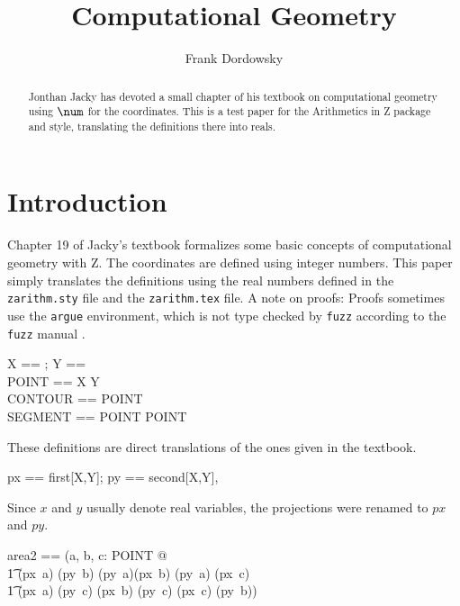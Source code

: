 \documentclass[12pt]{scrartcl}
\begin{document}
\title{Computational Geometry}
\author{Frank Dordowsky}

\maketitle

\begin{abstract}
  Jonthan Jacky has devoted a small chapter of his textbook
  \cite{Jacky1997a} on computational geometry using $\num$ for the
  coordinates. This is a test paper for the Arithmetics in Z package
  and style, translating the definitions there into reals.
\end{abstract}


\section{Introduction}
\label{sec:intro}
Chapter 19 of Jacky's textbook \cite{Jacky1997a} formalizes some basic
concepts of computational geometry with Z. The  coordinates are
defined using integer numbers. This paper simply translates the
definitions using the real numbers defined in the \texttt{zarithm.sty}
file and the \texttt{zarithm.tex} file.
%
A note on proofs: Proofs sometimes use the \texttt{argue} environment,
which is not type checked by \texttt{fuzz} according to the
\texttt{fuzz} manual \cite{Spivey2000}.
%
\begin{zed}
  X == \real; Y == \real \\
  POINT == X \cross Y \\
  CONTOUR == \seq POINT \\
  SEGMENT == POINT \cross POINT \\
\end{zed}
%
These definitions are direct translations of the ones given in the
textbook.
%
\begin{zed}
  px == first[X,Y]; py == second[X,Y], 
\end{zed}
%
Since $x$ and $y$ usually denote real variables, the projections were
renamed to $px$ and $py$.
%
\begin{zed}
  area2 == (\lambda a, b, c: POINT @ \\
  \t1 (px~a) \amult (py~b) \aminus (py~a)\amult (px~b) \aplus (py~a)\amult
  (px~c) \\
  \t1 \aminus (px~a) \amult (py~c) \aplus (px~b) \amult (py~c) \aminus
  (px~c) \amult (py~b))
\end{zed}
\end{document}
